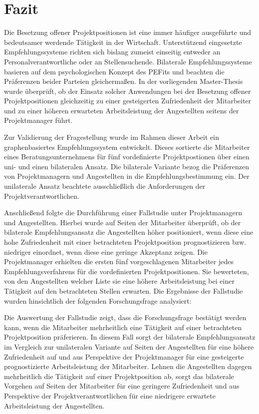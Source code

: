 \chapter{Fazit}
\label{ch:fazit}
Die Besetzung offener Projektpositionen ist eine immer häufiger ausgeführte und bedeutsamer werdende Tätigkeit in der Wirtschaft. Unterstützend eingesetzte Empfehlungssysteme richten sich bislang zumeist einseitig entweder an Personalverantwortliche oder an Stellensuchende. Bilaterale Empfehlungssysteme basieren auf dem psychologischen Konzept des \aclp{PEFit} und beachten die Präferenzen beider Parteien gleichermaßen. In der vorliegenden Master-Thesis wurde überprüft, ob der Einsatz solcher Anwendungen bei der Besetzung offener Projektpositionen gleichzeitig zu einer gesteigerten Zufriedenheit der Mitarbeiter und zu einer höheren erwarteten Arbeitsleistung der Angestellten seitens der Projektmanager führt. 

Zur Validierung der Fragestellung wurde im Rahmen dieser Arbeit ein graphenbasiertes Empfehlungssystem entwickelt. Dieses sortierte die Mitarbeiter eines Beratungsunternehmens für fünf vordefinierte Projektpostionen über einen uni- und einen bilateralen Ansatz. Die bilaterale Variante bezog die Präferenzen von Projektmanagern und Angestellten in die Empfehlungsbestimmung ein. Der unilaterale Ansatz beachtete ausschließlich die Anforderungen der Projektverantwortlichen.

Anschließend folgte die Durchführung einer Fallstudie unter Projektmanagern und Angestellten. Hierbei wurde auf Seiten der Mitarbeiter überprüft, ob der bilaterale Empfehlungsansatz die Angestellten höher positioniert, wenn diese eine hohe Zufriedenheit mit einer betrachteten Projektposition prognostizieren bzw. niedriger einordnet, wenn diese eine geringe Akzeptanz zeigen. Die Projektmanager erhielten die ersten fünf vorgeschlagenen Mitarbeiter jedes Empfehlungsverfahrens für die vordefinierten Projektpositionen. Sie bewerteten, von den Angestellten welcher Liste sie eine höhere Arbeitsleistung bei einer Tätigkeit auf den betrachteten Stellen erwarten. Die Ergebnisse der Fallstudie wurden hinsichtlich der folgenden Forschungsfrage analysiert: \forschungsfrage

Die Auswertung der Fallstudie zeigt, dass die Forschungsfrage bestätigt werden kann, wenn die Mitarbeiter mehrheitlich eine Tätigkeit auf einer betrachteten Projektposition präferieren. In diesem Fall sorgt der bilaterale Empfehlungsansatz im Vergleich zur unilateralen Variante auf Seiten der Angestellten für eine höhere Zufriedenheit auf und aus Perspektive der Projektmanager für eine gesteigerte prognostizierte Arbeitsleistung der Mitarbeiter. Lehnen die Angestellten dagegen mehrheitlich die Tätigkeit auf einer Projektposition ab, sorgt das bilaterale Vorgehen auf Seiten der Mitarbeiter für eine geringere Zufriedenheit und aus Perspektive der Projektverantwortlichen für eine niedrigere erwartete Arbeitsleistung der Angestellten.

